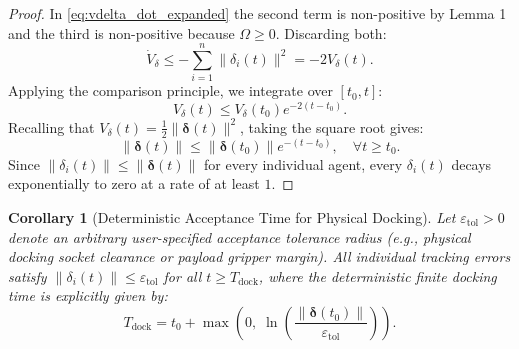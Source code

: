 \documentclass[11pt]{article}
\newtheorem{corollary}{Corollary}
\begin{document}
\begin{proof}
In \eqref{eq:vdelta_dot_expanded} the second term is non-positive by Lemma 1 and the third is non-positive because $\Omega \ge 0$. Discarding both:
\begin{equation}
\dot{V}_\delta \le -\sum_{i=1}^{n} \|\delta_i(t)\|^2 = -2 V_\delta(t).
\end{equation}
Applying the comparison principle, we integrate over $[t_0, t]$:
\begin{equation}
V_\delta(t) \le V_\delta(t_0) e^{-2(t - t_0)}.
\end{equation}
Recalling that $V_\delta(t) = \frac{1}{2}\|\boldsymbol{\delta}(t)\|^2$, taking the square root gives:
\begin{equation}
\|\boldsymbol{\delta}(t)\| \le \|\boldsymbol{\delta}(t_0)\| e^{-(t - t_0)}, \quad \forall t \ge t_0.
\end{equation}
Since $\|\delta_i(t)\| \le \|\boldsymbol{\delta}(t)\|$ for every individual agent, every $\delta_i(t)$ decays exponentially to zero at a rate of at least $1$.
\end{proof}

\begin{corollary}[Deterministic Acceptance Time for Physical Docking]
Let $\varepsilon_{\text{tol}} > 0$ denote an arbitrary user-specified acceptance tolerance radius (e.g., physical docking socket clearance or payload gripper margin). All individual tracking errors satisfy $\|\delta_i(t)\| \le \varepsilon_{\text{tol}}$ for all $t \ge T_{\text{dock}}$, where the deterministic finite docking time is explicitly given by:
\begin{equation}
T_{\text{dock}} = t_0 + \max\left(0, \; \ln\left(\frac{\|\boldsymbol{\delta}(t_0)\|}{\varepsilon_{\text{tol}}}\right)\right).
\label{eq:t_dock}
\end{equation}
\end{corollary}
\end{document}
